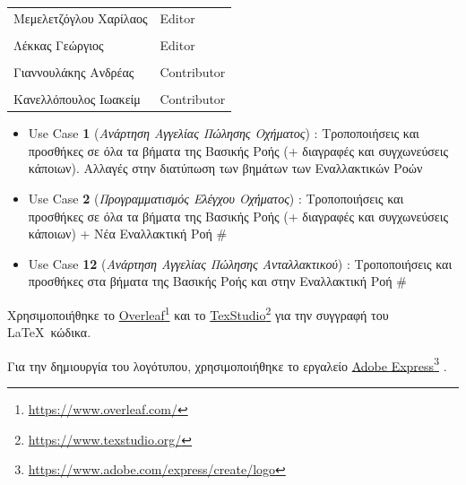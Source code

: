 \documentclass{../ol-softwaremanual}
\newcommand{\doclink}[2]{\href{#1}{#2}\footnote{\url{#1}}}
\begin{document}
	
	\vspace{20pt}
	
	\begin{table}[htbp!]
		\begin{tabular}{ll}
			Μεμελετζόγλου Χαρίλαος & \en Editor \\
			\\ Λέκκας Γεώργιος      &   \en  Editor \\
			\\ Γιαννουλάκης Ανδρέας & \en Contributor \\
			\\ Κανελλόπουλος Ιωακείμ & \en Contributor \\ 
		\end{tabular}
	\end{table}


	\vspace{10pt}
	
	\begin{itemize}
		\item \en Use Case \textbf{1} \gr (\textit{Ανάρτηση Αγγελίας Πώλησης Οχήματος}) : Τροποποιήσεις και προσθήκες σε όλα τα βήματα της Βασικής Ροής (+ διαγραφές και συγχωνεύσεις κάποιων). Αλλαγές στην διατύπωση των βημάτων των Εναλλακτικών Ροών
		
		\item \en Use Case \textbf{2} \gr (\textit{Προγραμματισμός Ελέγχου Οχήματος}) : Τροποποιήσεις και προσθήκες σε όλα τα βήματα της Βασικής Ροής (+ διαγραφές και συγχωνεύσεις κάποιων) + Νέα Εναλλακτική Ροή \en \# 

		\item \en Use Case \textbf{12} \gr (\textit{Ανάρτηση Αγγελίας Πώλησης Ανταλλακτικού}) : Τροποποιήσεις και προσθήκες στα βήματα της Βασικής Ροής και στην Εναλλακτική Ροή \en \# 
	\end{itemize}
	


	\newpage	
	
	
	\vspace{20pt}
	\flushleft
	Χρησιμοποιήθηκε το \en \doclink{https://www.overleaf.com/}{Overleaf} \gr και το \en \doclink{https://www.texstudio.org/}{TexStudio} \gr για την συγγραφή του \LaTeX\ κώδικα. \break
	
	Για την δημιουργία του λογότυπου, χρησιμοποιήθηκε το εργαλείο \en \doclink{https://www.adobe.com/express/create/logo}{Adobe Express} . \gr \break
	
\end{document}
